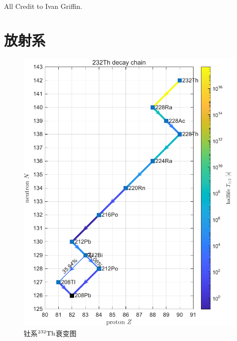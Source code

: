 All Credit to Ivan Griffin.

\chapter{放射系}

\begin{figure}[h]
	\centering
	\includegraphics[page=1]{figures/decay_system.pdf}
	\caption{钍系${^{232}\mathrm{Th}}$衰变图}
	\label{fig:decay_system 232Th}
\end{figure}


